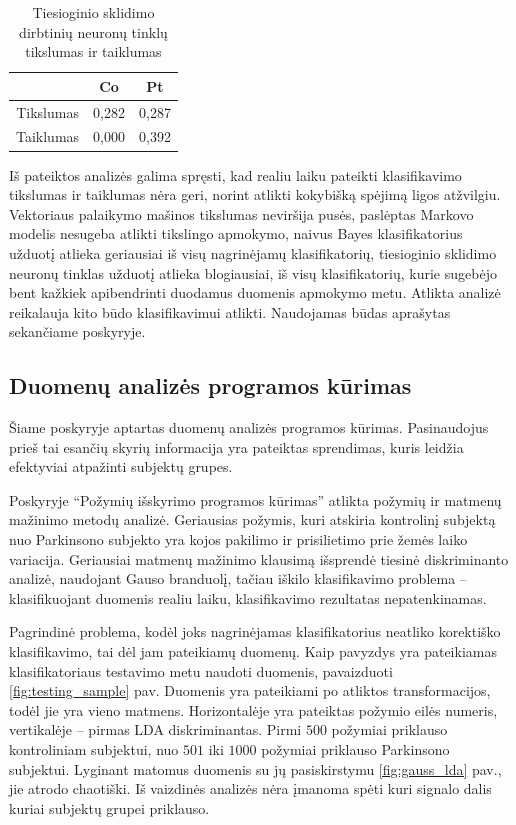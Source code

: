 \documentclass[]{vgtuef}
\begin{document}
\begin{table}
  \centering
  \renewcommand{\arraystretch}{1.3}
  \caption{Tiesioginio sklidimo dirbtinių neuronų tinklų tikslumas ir taiklumas}
  \label{table:ffn_scores}
  \begin{tabular}{|c|c|c|} \hline
    & Co & Pt \\ \hline
    Tikslumas & 0,282 & 0,287 \\ \hline
    Taiklumas & 0,000 & 0,392 \\ \hline
  \end{tabular}
\end{table}

Iš pateiktos analizės galima spręsti, kad realiu laiku pateikti klasifikavimo tikslumas ir taiklumas nėra geri, norint atlikti kokybišką spėjimą ligos atžvilgiu. Vektoriaus palaikymo mašinos tikslumas neviršija pusės, paslėptas Markovo modelis nesugeba atlikti tikslingo apmokymo, naivus Bayes klasifikatorius užduotį atlieka geriausiai iš visų nagrinėjamų klasifikatorių, tiesioginio sklidimo neuronų tinklas užduotį atlieka blogiausiai, iš visų klasifikatorių, kurie sugebėjo bent kažkiek apibendrinti duodamus duomenis apmokymo metu. Atlikta analizė reikalauja kito būdo klasifikavimui atlikti. Naudojamas būdas aprašytas sekančiame poskyryje.

\subsection{Duomenų analizės programos kūrimas}

Šiame poskyryje aptartas duomenų analizės programos kūrimas. Pasinaudojus prieš tai esančių skyrių informacija yra pateiktas sprendimas, kuris leidžia efektyviai atpažinti subjektų grupes.

Poskyryje ``Požymių išskyrimo programos kūrimas'' atlikta požymių ir matmenų mažinimo metodų analizė. Geriausias požymis, kuri atskiria kontrolinį subjektą nuo Parkinsono subjekto yra kojos pakilimo ir prisilietimo prie žemės laiko variacija. Geriausiai matmenų mažinimo klausimą išsprendė tiesinė diskriminanto analizė, naudojant Gauso branduolį, tačiau iškilo klasifikavimo problema -- klasifikuojant duomenis realiu laiku, klasifikavimo rezultatas nepatenkinamas. 

Pagrindinė problema, kodėl joks nagrinėjamas klasifikatorius neatliko korektiško klasifikavimo, tai dėl jam pateikiamų duomenų. Kaip pavyzdys yra pateikiamas klasifikatoriaus testavimo metu naudoti duomenis, pavaizduoti \ref{fig:testing_sample} pav. Duomenis yra pateikiami po atliktos transformacijos, todėl jie yra vieno matmens. Horizontalėje yra pateiktas požymio eilės numeris, vertikalėje -- pirmas LDA diskriminantas. Pirmi $500$ požymiai priklauso kontroliniam subjektui, nuo $501$ iki $1000$ požymiai priklauso Parkinsono subjektui. Lyginant matomus duomenis su jų pasiskirstymu \ref{fig:gauss_lda} pav., jie atrodo chaotiški. Iš vaizdinės analizės nėra įmanoma spėti kuri signalo dalis kuriai subjektų grupei priklauso. 
\end{document}

